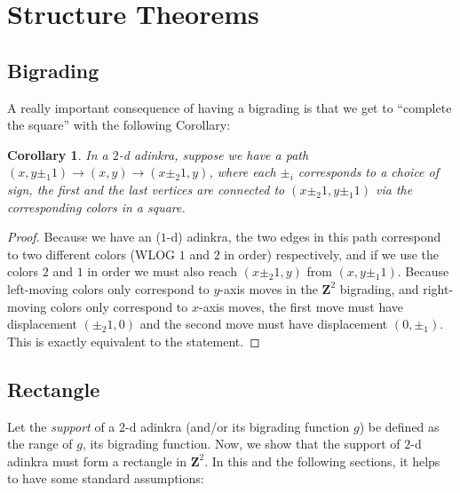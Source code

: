 \documentclass[12pt,twoside,singlespace]{article}
\numberwithin{equation}{section}
\newtheorem{cor}[equation]{Corollary}
\theoremstyle{definition}
\newcommand{\ZZ}{\mathbf{Z}}
\begin{document}
\section{Structure Theorems}

\subsection{Bigrading}


A really important consequence of having a bigrading is that we get to ``complete the square'' with the following Corollary:

\begin{cor}
\label{cor:square}
In a $2$-d adinkra, suppose we have a path $(x, y \pm_1 1) \rightarrow (x, y) \rightarrow (x \pm_2 1, y)$, where each $\pm_i$ corresponds to a choice of sign, the first and the last vertices are connected to $(x \pm_2 1, y \pm_1 1)$ via the corresponding colors in a square.
\end{cor}
\begin{proof}
Because we have an ($1$-d) adinkra, the two edges in this path correspond to two different colors (WLOG $1$ and $2$ in order) respectively, and if we use the colors $2$ and $1$ in order we must also reach $(x \pm_2 1, y)$ from $(x, y \pm_1 1)$. Because left-moving colors only correspond to $y$-axis moves in the $\ZZ^2$ bigrading, and right-moving colors only correspond to $x$-axis moves, the first move must have displacement $(\pm_2 1, 0)$ and the second move must have displacement $(0, \pm_1)$. This is exactly equivalent to the statement.
\end{proof}

\subsection{Rectangle}

Let the \emph{support} of a $2$-d adinkra (and/or its bigrading function $g$) be defined as the range of $g$, its bigrading function. Now, we show that the support of $2$-d adinkra must form a rectangle in $\ZZ^2$. In this and the following sections, it helps to have some standard assumptions:
\end{document}
